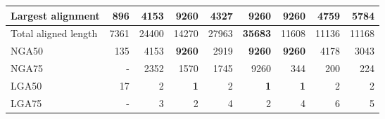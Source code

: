 \documentclass[12pt,a4paper]{article}
\begin{document}
\begin{table}[ht]
\begin{center}
\begin{tabular}{|l*{8}{|r}|}
Largest alignment & 896 & 4153 & {\bf 9260} & 4327 & {\bf 9260} & {\bf 9260} & 4759 & 5784 \\ \hline
Total aligned length & 7361 & 24400 & 14270 & 27963 & {\bf 35683} & 11608 & 11136 & 11168 \\ \hline
NGA50 & 135 & 4153 & {\bf 9260} & 2919 & {\bf 9260} & {\bf 9260} & 4178 & 3043 \\ \hline
NGA75 & - & 2352 & 1570 & 1745 & 9260 & 344 & 200 & 224 \\ \hline
LGA50 & 17 & 2 & {\bf 1} & 2 & {\bf 1} & {\bf 1} & 2 & 2 \\ \hline
LGA75 & - & 3 & 2 & 4 & 2 & 4 & 6 & 5 \\ \hline
\end{tabular}
\end{center}
\end{table}
\end{document}
